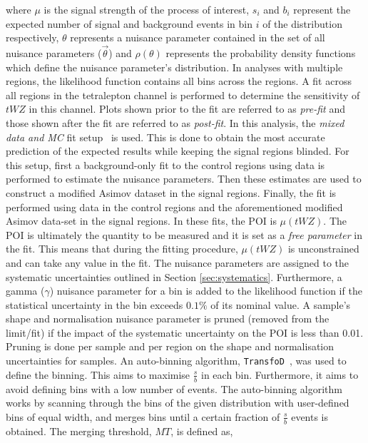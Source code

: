 where $\mu$ is the signal strength of the process of interest, $s_{i}$ and $b_{i}$ represent the expected number of signal and background events in bin $i$ of the distribution respectively, $\theta$ represents a nuisance parameter contained in the set of all nuisance parameters ($\vec{\theta}$) and $\rho(\theta)$ represents the probability density functions which define the nuisance parameter's distribution. In analyses with multiple regions, the likelihood function contains all bins across the regions. A fit across all regions in the tetralepton channel is performed to determine the sensitivity of $tWZ$ in this channel. Plots shown prior to the fit are referred to as \textit{pre-fit} and those shown after the fit are referred to as \textit{post-fit}. In this analysis, the \textit{mixed data and MC} fit setup~\cite{MixedDataAndMC_TRF} is used. This is done to obtain the most accurate prediction of the expected results while keeping the signal regions blinded. For this setup, first a background-only fit to the control regions using data is performed to estimate the nuisance parameters. Then these estimates are used to construct a modified Asimov dataset in the signal regions. Finally, the fit is performed using data in the control regions and the aforementioned modified Asimov data-set in the signal regions. In these fits, the POI is $\mu (tWZ)$. The POI is ultimately the quantity to be measured and it is set as a \textit{free parameter} in the fit. This means that during the fitting procedure, $\mu (tWZ)$ is unconstrained and can take any value in the fit. The nuisance parameters are assigned to the systematic uncertainties outlined in Section \ref{sec:systematics}. Furthermore, a gamma ($\gamma$) nuisance parameter for a bin is added to the likelihood function if the statistical uncertainty in the bin exceeds $0.1\%$ of its nominal value. A sample's shape and normalisation nuisance parameter is pruned (removed from the limit/fit) if the impact of the systematic uncertainty on the POI is less than 0.01. Pruning is done per sample and per region on the shape and normalisation uncertainties for samples. An auto-binning algorithm, \texttt{TransfoD}~\cite{transfod-autobin, Calvet:2296985}, was used to define the binning. This aims to maximise $\frac{s}{b}$ in each bin. Furthermore, it aims to avoid defining bins with a low number of events. The auto-binning algorithm works by scanning through the bins of the given distribution with user-defined bins of equal width, and merges bins until a certain fraction of $\frac{s}{b}$ events is obtained. The merging threshold, $MT$, is defined as,
